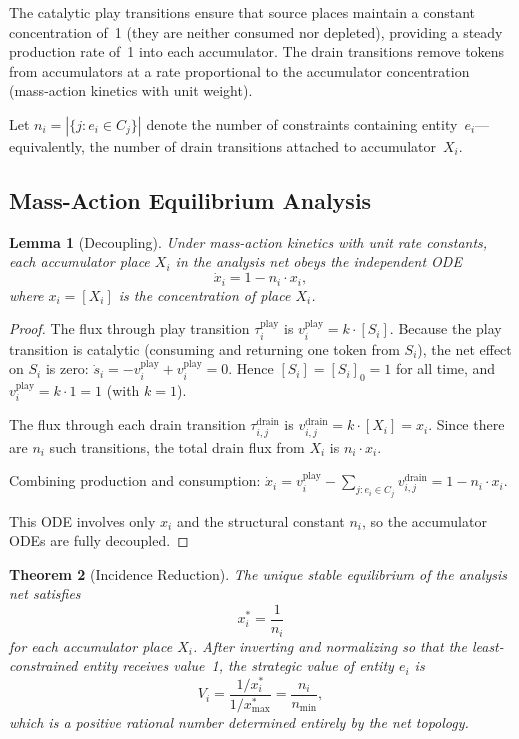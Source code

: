 \documentclass[11pt,a4paper]{article}
\newtheorem{theorem}{Theorem}
\newtheorem{lemma}[theorem]{Lemma}
\begin{document}
The catalytic play transitions ensure that source places maintain a constant concentration of~1 (they are neither consumed nor depleted), providing a steady production rate of~1 into each accumulator.
The drain transitions remove tokens from accumulators at a rate proportional to the accumulator concentration (mass-action kinetics with unit weight).

Let $n_i = |\{j : e_i \in C_j\}|$ denote the number of constraints containing entity~$e_i$---equivalently, the number of drain transitions attached to accumulator~$X_i$.

\subsection{Mass-Action Equilibrium Analysis}

\begin{lemma}[Decoupling]\label{lem:decoupling}
Under mass-action kinetics with unit rate constants, each accumulator place $X_i$ in the analysis net obeys the independent ODE
\begin{equation}\label{eq:accumulator-ode}
  \dot{x}_i = 1 - n_i \cdot x_i,
\end{equation}
where $x_i = [X_i]$ is the concentration of place $X_i$.
\end{lemma}

\begin{proof}
The flux through play transition $\tau_i^{\mathrm{play}}$ is $v_i^{\mathrm{play}} = k \cdot [S_i]$.
Because the play transition is catalytic (consuming and returning one token from $S_i$), the net effect on $S_i$ is zero: $\dot{s}_i = -v_i^{\mathrm{play}} + v_i^{\mathrm{play}} = 0$.
Hence $[S_i] = [S_i]_0 = 1$ for all time, and $v_i^{\mathrm{play}} = k \cdot 1 = 1$ (with $k = 1$).

The flux through each drain transition $\tau_{i,j}^{\mathrm{drain}}$ is $v_{i,j}^{\mathrm{drain}} = k \cdot [X_i] = x_i$.
Since there are $n_i$ such transitions, the total drain flux from $X_i$ is $n_i \cdot x_i$.

Combining production and consumption:
$\dot{x}_i = v_i^{\mathrm{play}} - \sum_{j : e_i \in C_j} v_{i,j}^{\mathrm{drain}} = 1 - n_i \cdot x_i$.

This ODE involves only $x_i$ and the structural constant $n_i$, so the accumulator ODEs are fully decoupled.
\end{proof}

\begin{theorem}[Incidence Reduction]\label{thm:incidence-reduction}
The unique stable equilibrium of the analysis net satisfies
\begin{equation}\label{eq:equilibrium}
  x_i^* = \frac{1}{n_i}
\end{equation}
for each accumulator place $X_i$.
After inverting and normalizing so that the least-constrained entity receives value~1, the \emph{strategic value} of entity $e_i$ is
\begin{equation}\label{eq:strategic-value}
  V_i = \frac{1/x_i^*}{1/x_{\max}^*} = \frac{n_i}{n_{\min}},
\end{equation}
which is a positive rational number determined entirely by the net topology.
\end{theorem}
\end{document}
